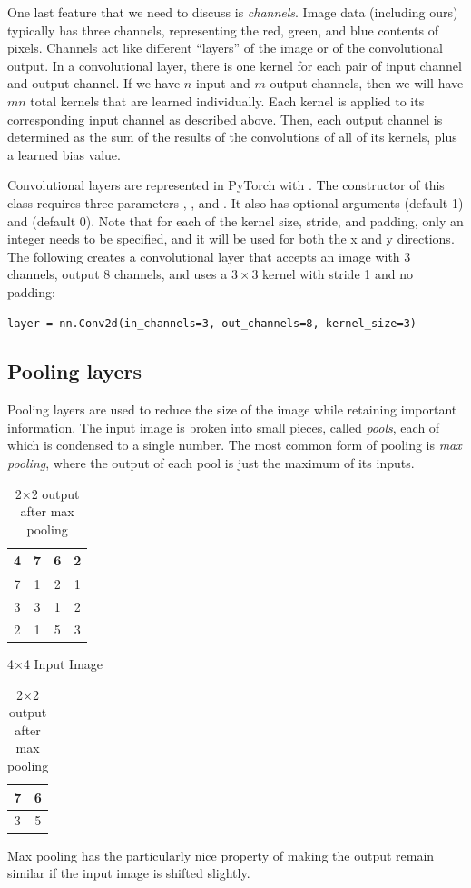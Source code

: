One last feature that we need to discuss is \emph{channels}.
Image data (including ours) typically has three channels, representing the red, green, and blue contents of pixels.
Channels act like different ``layers'' of the image or of the convolutional output.
In a convolutional layer, there is one kernel for each pair of input channel and output channel.
If we have \(n\) input and \(m\) output channels, then we will have \(mn\) total kernels that are learned individually.
Each kernel is applied to its corresponding input channel as described above.
Then, each output channel is determined as the sum of the results of the convolutions of all of its kernels, plus a learned bias value.

Convolutional layers are represented in PyTorch with .
The constructor of this class requires three parameters , , and .
It also has optional arguments  (default 1) and  (default 0).
Note that for each of the kernel size, stride, and padding, only an integer needs to be specified, and it will be used for both the x and y directions.
The following creates a convolutional layer that accepts an image with 3 channels, output 8 channels, and uses a \(3\times 3\) kernel with stride 1 and no padding:
\begin{lstlisting}
layer = nn.Conv2d(in_channels=3, out_channels=8, kernel_size=3)
\end{lstlisting}

\subsection*{Pooling layers}

Pooling layers are used to reduce the size of the image while retaining important information.
The input image is broken into small pieces, called \emph{pools}, each of which is condensed to a single number.
The most common form of pooling is \emph{max pooling}, where the output of each pool is just the maximum of its inputs.

\begin{table}[H]
\parbox{.45\linewidth}{
\centering
\begin{tabular}{|c|c||c|c|}
\hline
4 & 7 & 6 & 2\\
\hline
7 & 1 & 2 & 1\\
\hline
\hline
3 & 3 & 1 & 2\\
\hline
2 & 1 & 5 & 3\\
\hline
\end{tabular}
\label{tab:input}
\caption*{4$\times$4 Input Image}
}
\hfill
\parbox{.45\linewidth}{
\centering
\begin{tabular}{|c|c|}
\hline
7 & 6\\
\hline
3 & 5\\
\hline
\end{tabular}
\label{tab:input}
\caption*{2$\times$2 output after max pooling}
}
\end{table}
Max pooling has the particularly nice property of making the output remain similar if the input image is shifted slightly.

